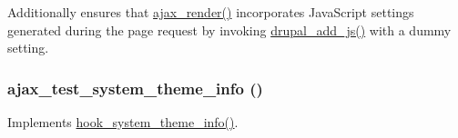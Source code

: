Additionally ensures that \hyperlink{group__ajax_ga241c2426bdde049c55b05b7bf5d714a2}{ajax\_\-render()} incorporates JavaScript settings generated during the page request by invoking \hyperlink{common_8inc_a623370a2c3c2de0390dab078d17dca02}{drupal\_\-add\_\-js()} with a dummy setting. \hypertarget{ajax__test_8module_ac0eabc02178682aebab6342ed3c93933}{
\subsubsection[{ajax\_\-test\_\-system\_\-theme\_\-info}]{\setlength{\rightskip}{0pt plus 5cm}ajax\_\-test\_\-system\_\-theme\_\-info ()}}
\label{ajax__test_8module_ac0eabc02178682aebab6342ed3c93933}
Implements \hyperlink{group__hooks_gaf21de71044d5a79bde481d2383e12c9a}{hook\_\-system\_\-theme\_\-info()}. 